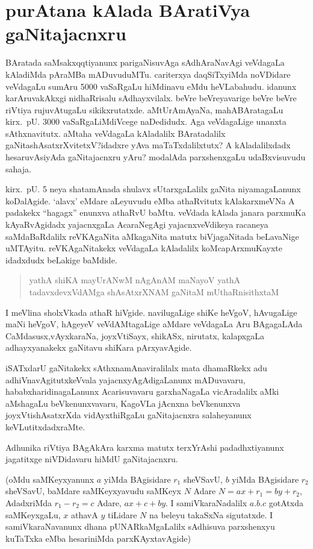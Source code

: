 \chapter{purAtana kAlada BAratiVya gaNitajacnxru}

 BAratada saMsakxqqtiyanunx parigaNisuvAga sAdhAraNavAgi veVdagaLa kAladiMda pAraMBa mADuvuduMTu. cariterxya daqSiTxyiMda noVDidare veVdagaLu sumAru {\rm 5000} vaSaRgaLu hiMdinavu eMdu heVLabahudu. idanunx karAruvakAkxgi nidhaRrisalu sAdhayx\-vilalx. beVre beVreyavarige beVre beVre riVtiya rujuvAtugaLu sikikxrutatxde. aMtU\break rAmAyaNa, mahABAratagaLu kirx.~pU. {\rm 3000} vaSaRgaLiMdiVcege naDedidudx. Aga veVdagaLige unanxta sAthxnavitutx. aMtaha veVdagaLa kAladalilx BAratadalilx gaNitashAsatxrXvitetxV?\break idadxre yAva maTaTxdalilxtutx? A kAladalilxdadx hesaruvAsiyAda gaNitajacnxru yAru? modalAda parxshenxgaLu udaBxvisuvudu sahaja.

kirx.~pU. {\rm 5} neya shatamAnada shulavx sUtarxgaLalilx gaNita niyamagaLanunx koDalAgide. `alavx' eMdare aLeyuvudu eMba athaRvitutx kAlakarxmeVNa A padakekx ``hagagx'' enunxva athaRvU baMtu. veVdada kAlada janara parxmuKa kAyaRvAgidadx yajacnxgaLa AcaraNegAgi yajacnxveVdikeya racaneya saMdaBaRdalilx reVKAgaNita aMkagaNita matutx biVja\-gaNitada beLavaNige uMTAyitu. reVKAgaNitakekx veVdagaLa kAladalilx koMca\break pArxmuKayxte idadxdudx beLakige baMdide.
\begin{verse}
yathA shiKA mayUrANwM nAgAnAM maNayoV yathA\\
tadavxdevxVdAMga shAsAtxrXNAM gaNitaM mUthaRnisithxtaM
\end{verse}

I meVlina sholxVkada athaR hiVgide. navilugaLige shiKe heVgoV, hAvugaLige maNi heVgoV, hAgeyeV veVdAMtagaLige aMdare veVdagaLa Aru BAgagaLAda CaMdasusx,\break vAyxkaraNa, joyxVtiSayx, shikASx, nirutatx, kalapxgaLa adhayxyanakekx gaNitavu shiKara pArxyavAgide.

iSATxdarU gaNitakekx sAthxnamAnaviralilalx mata dhamaRkekx adu adhiVnavAgitutx\break keVvala yajacnxyAgAdigaLanunx mADuvavaru, hababxharidinagaLanunx Acarisuvavaru garxhaNa\-gaLa vicAradalilx aMki aMshagaLu beVkenunxvavaru, KagoVLa jAcnxna beVkenunxva joyxVti\-shAsatxrXda vidAyxthiRgaLu gaNitajacnxra salaheyanunx keVLutitxdadxraMte.

Adhunika riVtiya BAgAkAra karxma matutx terxYrAshi padadhxtiyanunx jagatitxge niVDidavaru hiMdU gaNitajacnxru.

(oMdu saMKeyxyanunx $a$ yiMda BAgisidare $r_{1}$ sheVSavU, $b$ yiMda BAgisidare $r_{2}$ sheVSavU, baMdare saMKeyxyavudu saMKeyx $N$ Adare $N=ax+r_{1}=by+r_{2}$, AdadxriMda $r_{1}-r_{2}=c$ Adare, $ax+c+by$. I samiVkaraNadalilx $a. b. c$ gotAtxda saMKeyxgaLu, $x$ athavA $y$ tiLidare $N$ na beleyu takaSxNa sigutatxde. I samiVkaraNavanunx dhana pUNARkaMgaLalilx sAdhisuva parxshenxyu kuTaTxka eMba hesariniMda parxKAyxtavAgide)


